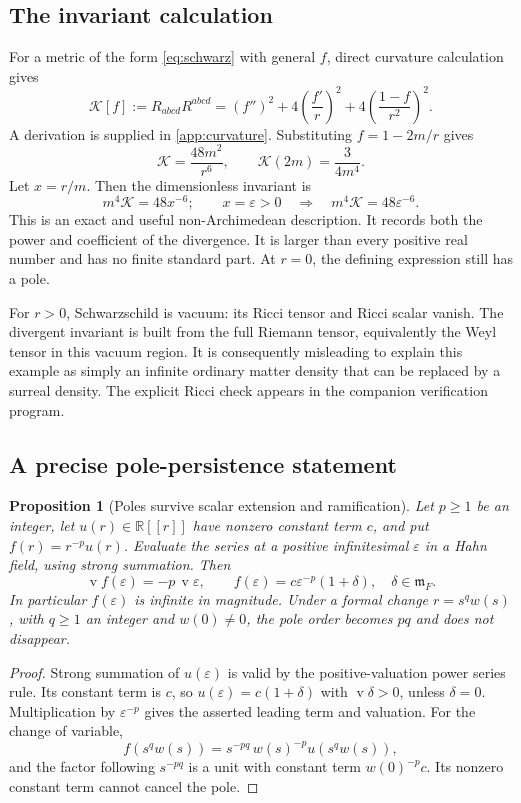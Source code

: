 \documentclass[11pt,a4paper]{article}
\numberwithin{equation}{section}
\newtheorem{proposition}[theorem]{Proposition}
\theoremstyle{definition}
\theoremstyle{remark}
\newcommand{\R}{\mathbb R}
\newcommand{\mm}{\mathfrak m}
\newcommand{\val}{\operatorname{v}}
\newcommand{\Kret}{\mathcal K}
\begin{document}
\subsection{The invariant calculation}
For a metric of the form \eqref{eq:schwarz} with general $f$, direct curvature
calculation gives
\begin{equation}\label{eq:Kgeneral}
\Kret[f]:=R_{abcd}R^{abcd}
 =(f'')^2+4\left(\frac{f'}r\right)^2
       +4\left(\frac{1-f}{r^2}\right)^2.
\end{equation}
A derivation is supplied in \cref{app:curvature}. Substituting $f=1-2m/r$ gives
\begin{equation}\label{eq:Kschwarz}
\Kret=\frac{48m^2}{r^6},\qquad
\Kret(2m)=\frac{3}{4m^4}.
\end{equation}
Let $x=r/m$. Then the dimensionless invariant is
\begin{equation}\label{eq:Keps}
m^4\Kret=48x^{-6};\qquad x=\varepsilon>0
\quad\Longrightarrow\quad m^4\Kret=48\varepsilon^{-6}.
\end{equation}
This is an exact and useful non-Archimedean description. It records both the
power and coefficient of the divergence. It is larger than every positive real
number and has no finite standard part. At $r=0$, the defining expression still
has a pole.

For $r>0$, Schwarzschild is vacuum: its Ricci tensor and Ricci scalar vanish.
The divergent invariant is built from the full Riemann tensor, equivalently the
Weyl tensor in this vacuum region. It is consequently misleading to explain
this example as simply an infinite ordinary matter density that can be replaced
by a surreal density. The explicit Ricci check appears in the companion
verification program.

\subsection{A precise pole-persistence statement}
\begin{proposition}[Poles survive scalar extension and ramification]\label{prop:pole}
Let $p\ge1$ be an integer, let $u(r)\in\R[[r]]$ have nonzero constant term
$c$, and put $f(r)=r^{-p}u(r)$. Evaluate the series at a positive infinitesimal
$\varepsilon$ in a Hahn field, using strong summation. Then
\[
\val f(\varepsilon)=-p\,\val\varepsilon,
\qquad f(\varepsilon)=c\varepsilon^{-p}(1+\delta),
\quad \delta\in\mm_F.
\]
In particular $f(\varepsilon)$ is infinite in magnitude. Under a formal change
$r=s^q w(s)$, with $q\ge1$ an integer and $w(0)\ne0$, the pole order becomes
$pq$ and does not disappear.
\end{proposition}
\begin{proof}
Strong summation of $u(\varepsilon)$ is valid by the positive-valuation power
series rule. Its constant term is $c$, so $u(\varepsilon)=c(1+\delta)$ with
$\val\delta>0$, unless $\delta=0$. Multiplication by
$\varepsilon^{-p}$ gives the asserted leading term and valuation. For the
change of variable,
\[
f(s^q w(s))=s^{-pq}\,w(s)^{-p}u(s^q w(s)),
\]
and the factor following $s^{-pq}$ is a unit with constant term
$w(0)^{-p}c$. Its nonzero constant term cannot cancel the pole.
\end{proof}
\end{document}

